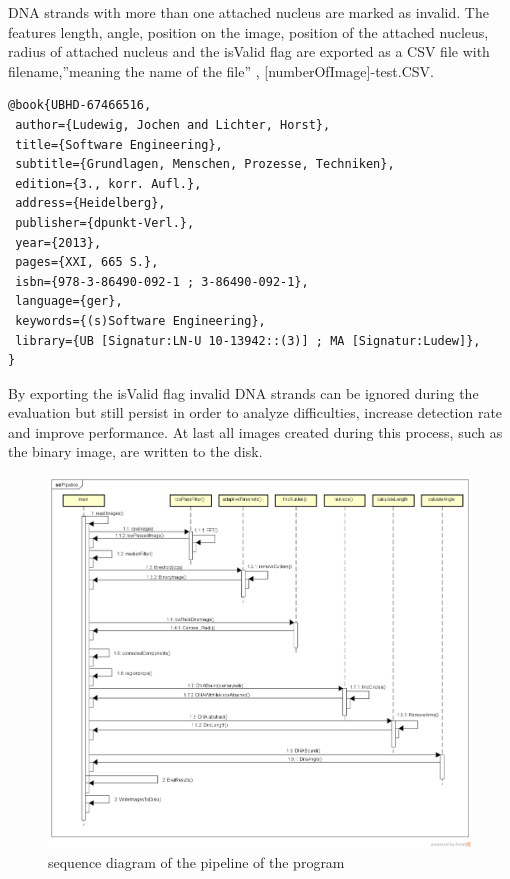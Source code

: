 \documentclass{article}
\begin{document}
DNA strands with more than one attached nucleus are marked as invalid.
The features length, angle, position on the image, position of the attached nucleus, radius of attached nucleus and the isValid flag are exported as a CSV file with filename,''meaning the name of the file''  \cite{UBHD-67466516},  [numberOfImage]-test.CSV.
\begin{verbatim}
@book{UBHD-67466516,
 author={Ludewig, Jochen and Lichter, Horst},
 title={Software Engineering},
 subtitle={Grundlagen, Menschen, Prozesse, Techniken},
 edition={3., korr. Aufl.},
 address={Heidelberg},
 publisher={dpunkt-Verl.},
 year={2013},
 pages={XXI, 665 S.},
 isbn={978-3-86490-092-1 ; 3-86490-092-1},
 language={ger},
 keywords={(s)Software Engineering},
 library={UB [Signatur:LN-U 10-13942::(3)] ; MA [Signatur:Ludew]},
}
\end{verbatim}

By exporting the isValid flag invalid DNA strands can be ignored during the evaluation but still persist in order to analyze difficulties, increase detection rate and improve performance.
At last all images created during this process, such as the binary image, are written to the disk.


\begin{figure} [!ht]
	
      \includegraphics[width=1\linewidth]{Pipeline.png}

	\caption{sequence diagram of the pipeline of the program} %
	\label{fig:PipelineDiagram} 
\end{figure}
\end{document}
